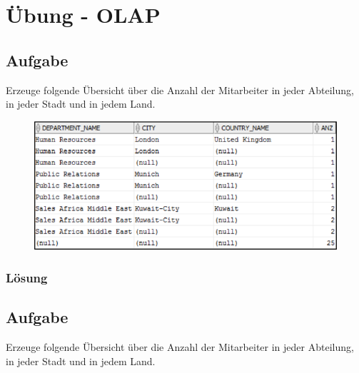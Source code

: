 \section{Übung - OLAP}
\label{sec:uebung_06}

\label{subsec:uebung_06.aufgabe_01}
\subsection{Aufgabe}
Erzeuge folgende Übersicht über die Anzahl der Mitarbeiter in jeder Abteilung, in jeder Stadt und in jedem Land.

\begin{figure}[H]
  \centering
  \includegraphics[width=1\textwidth]{img//uebung_06_-_aufgabe_01.png}
  \label{img:uebung_06_-_aufgabe_01}
\end{figure} 

\subsubsection*{Lösung}
\label{subsubsec:uebung_06.aufgabe_01.loesung}


\label{subsec:uebung_06.aufgabe_02}
\subsection{Aufgabe}
Erzeuge folgende Übersicht über die Anzahl der Mitarbeiter in jeder Abteilung, in jeder Stadt und in jedem Land.

